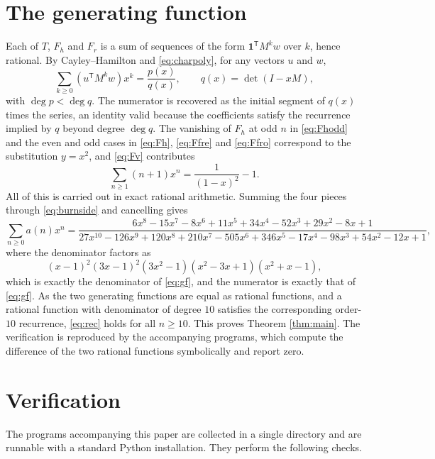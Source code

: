 \documentclass[12pt]{article}
\theoremstyle{definition}
\begin{document}
\section{The generating function}

Each of $T$, $F_h$ and $F_r$ is a sum of sequences of the form
$\mathbf{1}^{\mathsf{T}} M^{k} w$ over $k$, hence rational. By
Cayley--Hamilton and \eqref{eq:charpoly}, for any vectors $u$ and $w$,
\[
\sum_{k \ge 0} (u^{\mathsf{T}} M^k w) x^k = \frac{p(x)}{q(x)},
\qquad q(x) = \det(I - xM),
\]
with $\deg p < \deg q$. The numerator is recovered as the initial segment of
$q(x)$ times the series, an identity valid because the coefficients satisfy the
recurrence implied by $q$ beyond degree $\deg q$. The vanishing of $F_h$ at odd
$n$ in \eqref{eq:Fhodd} and the even and odd cases in \eqref{eq:Fh},
\eqref{eq:Ffre} and \eqref{eq:Ffro} correspond to the substitution $y = x^2$,
and \eqref{eq:Fv} contributes
\[
\sum_{n \ge 1} (n+1) x^n = \frac{1}{(1-x)^2} - 1 .
\]
All of this is carried out in exact rational arithmetic. Summing the four pieces
through \eqref{eq:burnside} and cancelling gives
\[
\sum_{n \ge 0} a(n) x^n
 = \frac{6x^8 - 15x^7 - 8x^6 + 11x^5 + 34x^4 - 52x^3 + 29x^2 - 8x + 1}
        {27x^{10} - 126x^9 + 120x^8 + 210x^7 - 505x^6 + 346x^5
         - 17x^4 - 98x^3 + 54x^2 - 12x + 1},
\]
where the denominator factors as
\[
(x-1)^2 (3x-1)^2 (3x^2-1) (x^2-3x+1) (x^2+x-1),
\]
which is exactly the denominator of \eqref{eq:gf}, and the numerator is exactly
that of \eqref{eq:gf}. As the two generating functions are equal as rational
functions, and a rational function with denominator of degree $10$ satisfies the
corresponding order-$10$ recurrence, \eqref{eq:rec} holds for all $n \ge 10$.
This proves Theorem \ref{thm:main}. The verification is reproduced by the
accompanying programs, which compute the difference of the two rational
functions symbolically and report zero.

\section{Verification}

The programs accompanying this paper are collected in a single directory and
are runnable with a standard Python installation. They perform the following
checks.
\end{document}
